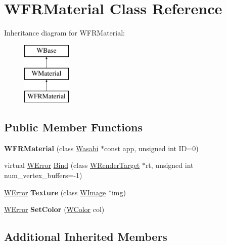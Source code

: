 \hypertarget{class_w_f_r_material}{}\section{W\+F\+R\+Material Class Reference}
\label{class_w_f_r_material}
Inheritance diagram for W\+F\+R\+Material\+:\begin{figure}[H]
\begin{center}
\leavevmode
\includegraphics[height=3.000000cm]{class_w_f_r_material}
\end{center}
\end{figure}
\subsection*{Public Member Functions}
\begin{DoxyCompactItemize}
\item 
{\bfseries W\+F\+R\+Material} (class \hyperlink{class_wasabi}{Wasabi} $\ast$const app, unsigned int ID=0)\hypertarget{class_w_f_r_material_a870f81f67384798616d72ef0bf4228d5}{}\label{class_w_f_r_material_a870f81f67384798616d72ef0bf4228d5}

\item 
virtual \hyperlink{class_w_error}{W\+Error} \hyperlink{class_w_f_r_material_ab57a021a6e21d2c6dc872d6ea4450093}{Bind} (class \hyperlink{class_w_render_target}{W\+Render\+Target} $\ast$rt, unsigned int num\+\_\+vertex\+\_\+buffers=-\/1)
\item 
\hyperlink{class_w_error}{W\+Error} {\bfseries Texture} (class \hyperlink{class_w_image}{W\+Image} $\ast$img)\hypertarget{class_w_f_r_material_acc4467bcda7cc98023847549541bd0eb}{}\label{class_w_f_r_material_acc4467bcda7cc98023847549541bd0eb}

\item 
\hyperlink{class_w_error}{W\+Error} {\bfseries Set\+Color} (\hyperlink{class_w_color}{W\+Color} col)\hypertarget{class_w_f_r_material_a934ef9d40c49b7bc0faea7c941746520}{}\label{class_w_f_r_material_a934ef9d40c49b7bc0faea7c941746520}

\end{DoxyCompactItemize}
\subsection*{Additional Inherited Members}


